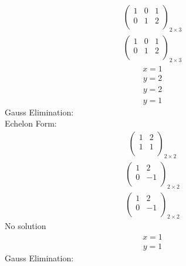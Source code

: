 \documentclass{article}
\begin{document}
\begin{align*}
\left(
\begin{array}{cc|c}
1 & 0 & 1\\
0 & 1 & 2\\
\end{array}
\right)_{2\times 3}
\end{align*}
\begin{align*}
\left(
\begin{array}{cc|c}
1 & 0 & 1\\
0 & 1 & 2\\
\end{array}
\right)_{2\times 3}
\end{align*}
\begin{align*}
x=1\end{align*}
\begin{align*}
y=2\end{align*}
\begin{align*}
y=2\end{align*}
\begin{align*}
y=1\end{align*}
Gauss Elimination:\\
Echelon Form:\\
\begin{align*}
\left(
\begin{array}{c|c}
1 & 2\\
1 & 1\\
\end{array}
\right)_{2\times 2}
\end{align*}
\begin{align*}
\left(
\begin{array}{c|c}
1 & 2\\
0 & -1\\
\end{array}
\right)_{2\times 2}
\end{align*}
\begin{align*}
\left(
\begin{array}{c|c}
1 & 2\\
0 & -1\\
\end{array}
\right)_{2\times 2}
\end{align*}
No solution\\
\begin{align*}
x=1\end{align*}
\begin{align*}
y=1\end{align*}
Gauss Elimination:\\
\end{document}
